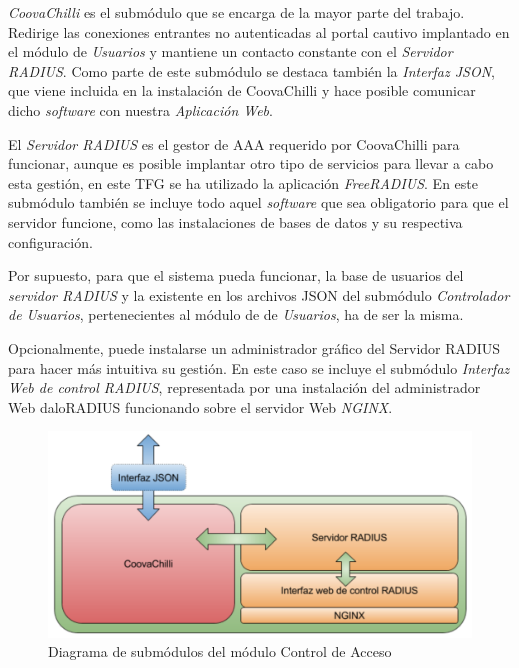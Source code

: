 \emph{CoovaChilli} es el submódulo que se encarga de la mayor parte del trabajo. Redirige las conexiones entrantes no autenticadas al portal cautivo implantado en el módulo de \emph{Usuarios} y mantiene un contacto constante con el \emph{Servidor RADIUS}. Como parte de este submódulo se destaca también la \emph{Interfaz JSON}, que viene incluida en la instalación de CoovaChilli y hace posible comunicar dicho \emph{software} con nuestra \emph{Aplicación Web}.

El \emph{Servidor RADIUS} es el gestor de AAA requerido por CoovaChilli para funcionar, aunque es posible implantar otro tipo de servicios para llevar a cabo esta gestión, en este TFG se ha utilizado la aplicación \emph{FreeRADIUS}. En este submódulo también se incluye todo aquel \emph{software} que sea obligatorio para que el servidor funcione, como las instalaciones de bases de datos y su respectiva configuración.

Por supuesto, para que el sistema pueda funcionar, la base de usuarios del \emph{servidor RADIUS} y la existente en los archivos JSON del submódulo \emph{Controlador de Usuarios}, pertenecientes al módulo de de \emph{Usuarios}, ha de ser la misma.

Opcionalmente, puede instalarse un administrador gráfico del Servidor RADIUS para hacer más intuitiva su gestión. En este caso se incluye el submódulo \emph{Interfaz Web de control RADIUS}, representada por una instalación del administrador Web daloRADIUS funcionando sobre el servidor Web \emph{NGINX}.

\begin{figure}[!t]
\begin{center}
\includegraphics[width=0.75\linewidth]{./4_AnalisisFuncional/Img/moduloControlAcceso.png}
\end{center}
\caption{Diagrama de submódulos del módulo Control de Acceso}
\label{moduloControlAcceso}
\end{figure}


